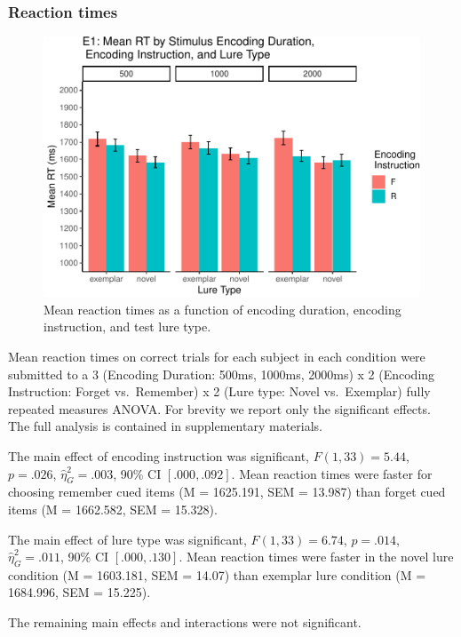 \documentclass[
  man,floatsintext]{apa6}
\begin{document}
\hypertarget{reaction-times}{%
\subsubsection{Reaction times}\label{reaction-times}}

\begin{figure}
\centering
\includegraphics{honorsThesis_NEW_files/figure-latex/E1fig2-1.pdf}
\caption{\label{fig:E1fig2}Mean reaction times as a function of encoding duration, encoding instruction, and test lure type.}
\end{figure}

Mean reaction times on correct trials for each subject in each condition were submitted to a 3 (Encoding Duration: 500ms, 1000ms, 2000ms) x 2 (Encoding Instruction: Forget vs.~Remember) x 2 (Lure type: Novel vs.~Exemplar) fully repeated measures ANOVA. For brevity we report only the significant effects. The full analysis is contained in supplementary materials.

The main effect of encoding instruction was significant, \(F(1, 33) = 5.44\), \(p = .026\), \(\hat{\eta}^2_G = .003\), 90\% CI \([.000, .092]\). Mean reaction times were faster for choosing remember cued items (M = 1625.191, SEM = 13.987) than forget cued items (M = 1662.582, SEM = 15.328).

The main effect of lure type was significant, \(F(1, 33) = 6.74\), \(p = .014\), \(\hat{\eta}^2_G = .011\), 90\% CI \([.000, .130]\). Mean reaction times were faster in the novel lure condition (M = 1603.181, SEM = 14.07) than exemplar lure condition (M = 1684.996, SEM = 15.225).

The remaining main effects and interactions were not significant.
\end{document}
